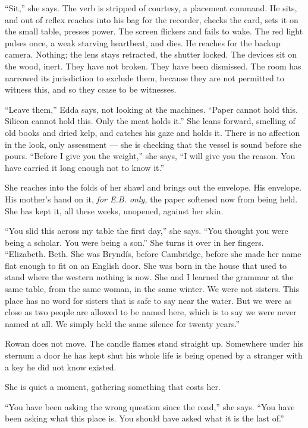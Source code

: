 \documentclass[11pt,oneside]{book}
\begin{document}
``Sit,'' she says. The verb is stripped of courtesy, a placement
command. He sits, and out of reflex reaches into his bag for the
recorder, checks the card, sets it on the small table, presses power.
The screen flickers and fails to wake. The red light pulses once, a weak
starving heartbeat, and dies. He reaches for the backup camera. Nothing;
the lens stays retracted, the shutter locked. The devices sit on the
wood, inert. They have not broken. They have been dismissed. The room
has narrowed its jurisdiction to exclude them, because they are not
permitted to witness this, and so they cease to be witnesses.

``Leave them,'' Edda says, not looking at the machines. ``Paper cannot
hold this. Silicon cannot hold this. Only the meat holds it.'' She leans
forward, smelling of old books and dried kelp, and catches his gaze and
holds it. There is no affection in the look, only assessment --- she is
checking that the vessel is sound before she pours. ``Before I give you
the weight,'' she says, ``I will give you the reason. You have carried
it long enough not to know it.''

She reaches into the folds of her shawl and brings out the envelope. His
envelope. His mother's hand on it, \emph{for E.B. only,} the paper
softened now from being held. She has kept it, all these weeks,
unopened, against her skin.

``You slid this across my table the first day,'' she says. ``You thought
you were being a scholar. You were being a son.'' She turns it over in
her fingers. ``Elizabeth. Beth. She was Bryndís, before Cambridge,
before she made her name flat enough to fit on an English door. She was
born in the house that used to stand where the western nothing is now.
She and I learned the grammar at the same table, from the same woman, in
the same winter. We were not sisters. This place has no word for sisters
that is safe to say near the water. But we were as close as two people
are allowed to be named here, which is to say we were never named at
all. We simply held the same silence for twenty years.''

Rowan does not move. The candle flames stand straight up. Somewhere
under his sternum a door he has kept shut his whole life is being opened
by a stranger with a key he did not know existed.

She is quiet a moment, gathering something that costs her.

``You have been asking the wrong question since the road,'' she says.
``You have been asking what this place is. You should have asked what it
is the last of.''
\end{document}

